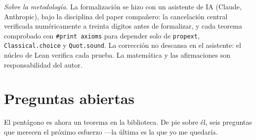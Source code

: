 \documentclass[11pt]{article}
\newcommand{\lean}[1]{\texttt{#1}}
\begin{document}
\emph{Sobre la metodolog\'ia.} La formalizaci\'on se hizo con un asistente de IA (Claude,
Anthropic), bajo la disciplina del paper compa\~nero: la cancelaci\'on central verificada
num\'ericamente a treinta d\'igitos antes de formalizar, y cada teorema comprobado con
\lean{\#print axioms} para depender solo de \lean{propext}, \lean{Classical.choice} y
\lean{Quot.sound}. La correcci\'on no descansa en el asistente: el n\'ucleo de Lean verifica
cada prueba. La matem\'atica y las afirmaciones son responsabilidad del autor.

\section{Preguntas abiertas}\label{sec:questions}

El pent\'agono es ahora un teorema en la biblioteca. De pie sobre \'el, seis preguntas que
merecen el pr\'oximo esfuerzo ---la \'ultima es la que yo me quedar\'ia.
\end{document}
